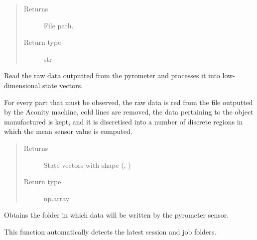\documentclass[letterpaper,10pt,english,openany,oneside]{sphinxmanual}
\begin{document}
\begin{fulllineitems}
\begin{fulllineitems}
\begin{quote}
\begin{description}
\begin{itemize}
\end{itemize}

\item[{Returns}] \leavevmode
File path.

\item[{Return type}] \leavevmode
str

\end{description}\end{quote}

\end{fulllineitems}


\begin{fulllineitems}
\label{\detokenize{_modules/machine:machine.Machine.getStates}}
Read the raw data outputted from the pyrometer and processes it into
low-dimensional state vectors.

For every part that must be observed, the raw data is red from the file
outputted by the Aconity machine, cold lines are removed, the data pertaining
to the object manufactured is kept, and it is discretised into a number
of discrete regions in which the mean sensor value is computed.
\begin{quote}\begin{description}
\item[{Returns}] \leavevmode
State vectors with shape (,  )

\item[{Return type}] \leavevmode
np.array

\end{description}\end{quote}

\end{fulllineitems}


\begin{fulllineitems}
\label{\detokenize{_modules/machine:machine.Machine.initProcessing}}
Obtains the folder in which data will be written by the pyrometer sensor.

This function automatically detects the latest session and job folders.


\end{fulllineitems}
\end{fulllineitems}
\end{document}
